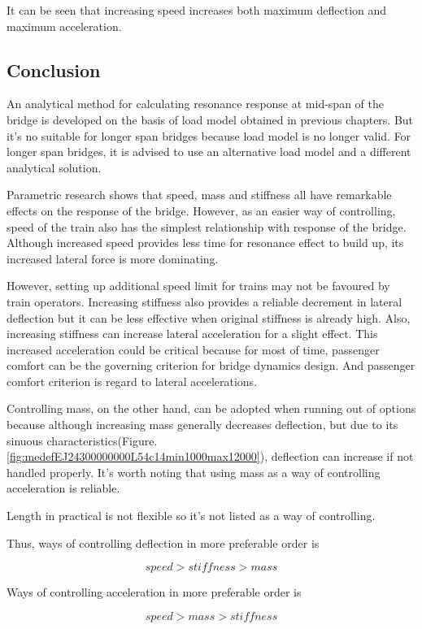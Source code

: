 It can be seen that increasing speed increases both maximum deflection and maximum acceleration. 

\subsection{Conclusion}

An analytical method for calculating resonance response at mid-span of the bridge is developed on the basis of load model obtained in previous chapters. But it's no suitable for longer span bridges because load model is no longer valid. For longer span bridges, it is advised to use an alternative load model and a different analytical solution.

Parametric research shows that speed, mass and stiffness all have remarkable effects on the response of the bridge. However, as an easier way of controlling, speed of the train also has the simplest relationship with response of the bridge. Although increased speed provides less time for resonance effect to build up, its increased lateral force is more dominating. 

However, setting up additional speed limit for trains may not be favoured by train operators. Increasing stiffness also provides a reliable decrement in lateral deflection but it can be less effective when original stiffness is already high. Also, increasing stiffness can increase lateral acceleration for a slight effect. This increased acceleration could be critical because for most of time, passenger comfort can be the governing criterion for bridge dynamics design. And passenger comfort criterion is regard to lateral accelerations. 

Controlling mass, on the other hand, can be adopted when running out of options because although increasing mass generally decreases deflection, but due to its sinuous characteristics(Figure.\ref{fig:medefEJ24300000000L54c14min1000max12000}), deflection can increase if not handled properly. It's worth noting that using mass as a way of controlling acceleration is reliable.

Length in practical is not flexible so it's not listed as a way of controlling.

Thus, ways of controlling deflection in more preferable order is 

$$speed > stiffness > mass$$

Ways of controlling acceleration in more preferable order is 

$$speed > mass > stiffness$$




